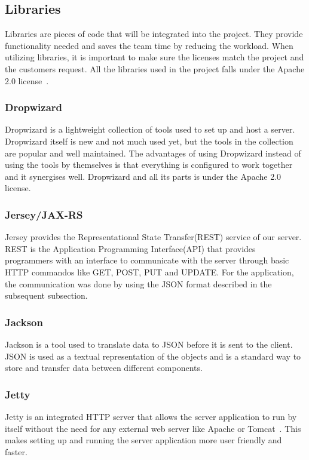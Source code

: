 \subsection{Libraries}
\label{sec:libraries}
Libraries are pieces of code that will be integrated into the project. They provide functionality needed and saves the team time by reducing the workload. 
When utilizing libraries, it is important to make sure the licenses match the project and the customers request. All the libraries used in the project falls under the Apache 2.0 license~\cite{Apache}.

\subsubsection{Dropwizard}
Dropwizard is a lightweight collection of tools used to set up and host a server. Dropwizard itself is new and not much used yet, but the tools in the collection are popular and well maintained. 
The advantages of using Dropwizard instead of using the tools by themselves is that everything is configured to work together and it synergises well.
Dropwizard and all its parts is under the Apache 2.0 license. 


\subsubsection{Jersey/JAX-RS}
Jersey provides the Representational State Transfer(REST) service of our server. REST is the Application Programming Interface(API) that provides programmers with an 
interface to communicate with the server through basic HTTP commandos like GET, POST, PUT and UPDATE. For the application, the communication was done by using the JSON format 
described in the subsequent subsection.

\subsubsection{Jackson}
Jackson is a tool used to translate data to JSON before it is sent to the client. JSON is used as a textual representation of the objects and is a standard way to store 
and transfer data between different components.

\subsubsection{Jetty}
Jetty is an integrated HTTP server that allows the server application to run by itself without the need for any external web server like Apache or Tomcat~\cite{tomcat}. 
This makes setting up and running the server application more user friendly and faster.


